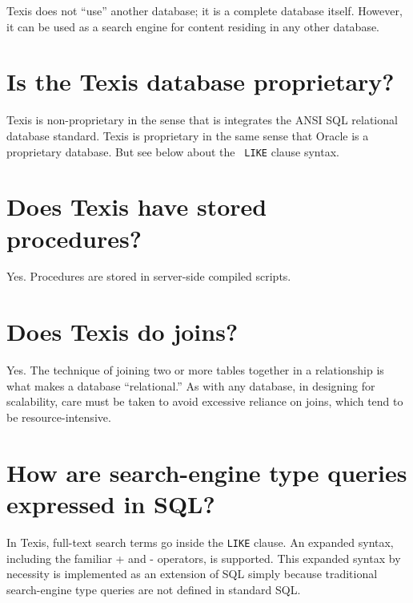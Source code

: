 Texis does not ``use'' another database; it is a complete database
itself. However, it can be used as a search engine for content
residing in any other database.

\section{Is the Texis database proprietary? }

Texis is non-proprietary in the sense that is integrates the ANSI SQL
relational database standard. Texis is proprietary in the same sense
that Oracle is a proprietary database.  But see below about the {\tt
  LIKE} clause syntax.

\section{Does Texis have stored procedures? } 

Yes. Procedures are stored in server-side compiled scripts.

\section{Does Texis do joins? }

Yes. The technique of joining two or more tables together in a
relationship is what makes a database ``relational.'' As with any
database, in designing for scalability, care must be taken to avoid
excessive reliance on joins, which tend to be resource-intensive.

\section{How are search-engine type queries expressed in SQL? }

In Texis, full-text search terms go inside the {\tt LIKE} clause.  An
expanded syntax, including the familiar + and - operators, is
supported.  This expanded syntax by necessity is implemented as an
extension of SQL simply because traditional search-engine type queries
are not defined in standard SQL.

